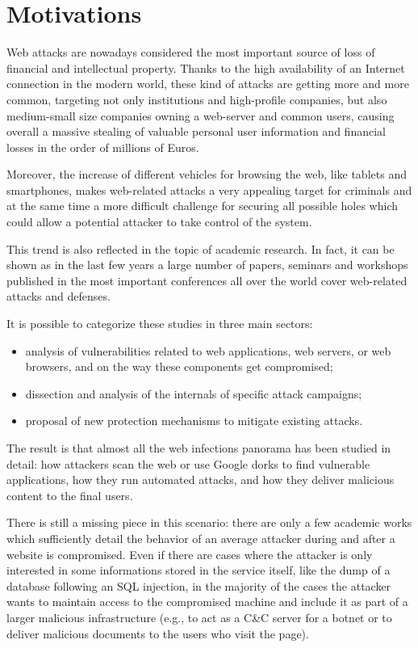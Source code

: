 \section{Motivations}

Web attacks are nowadays considered the most important source of loss of financial and intellectual property.
Thanks to the high availability of an Internet connection in the modern world, these kind of attacks are getting more and more common, targeting not only institutions and high-profile companies, but also medium-small size companies owning a web-server and common users, causing overall a massive stealing of valuable personal user information and financial losses in the order of millions of Euros.

Moreover, the increase of different vehicles for browsing the web, like tablets and smartphones, makes web-related attacks a very appealing target for criminals and at the same time a more difficult challenge for securing all possible holes which could allow a potential attacker to take control of the system.

This trend is also reflected in the topic of academic research. In fact, it can be shown as in the last few years a large number of papers, seminars and workshops published in the most important conferences all over the world cover web-related attacks and defenses.

It is possible to categorize these studies in three main sectors:
\begin{itemize}
\item analysis of vulnerabilities related to web applications, web servers, or web browsers, and on the way these components get compromised;
\item dissection and analysis of the internals of specific attack campaigns;
\item proposal of new protection mechanisms to mitigate existing attacks.
\end{itemize}
The result is that almost all the web infections panorama has been studied in detail: how attackers scan the web or use Google dorks to find vulnerable applications, how they run automated attacks, and how they deliver malicious content to the final users.

There is still a missing piece in this scenario: there are only a few academic works which sufficiently detail the behavior of an average attacker during and after a website is compromised.
Even if there are cases where the attacker is only interested in some informations stored in the service itself, like the dump of a database following an SQL injection, in the majority of the cases the attacker wants to maintain access to the compromised machine and include it as part of a larger malicious infrastructure (e.g., to act as a C\&C server for a botnet or to deliver malicious documents to the users who visit the page).


